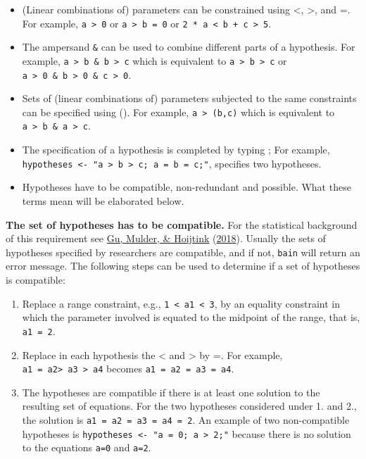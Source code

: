 \documentclass[
]{book}
\providecommand{\tightlist}{%
  \setlength{\itemsep}{0pt}\setlength{\parskip}{0pt}}
\begin{document}
\begin{itemize}
\tightlist
\item
  (Linear combinations of) parameters can be constrained using \textless, \textgreater, and
  =. For example, \texttt{a\ \textgreater{}\ 0} or
  \texttt{a\ \textgreater{}\ b\ =\ 0} or \texttt{2\ *\ a\ \textless{}\ b\ +\ c\ \textgreater{}\ 5}.
\item
  The ampersand \texttt{\&} can be used to combine different parts of a hypothesis.
  For example, \texttt{a\ \textgreater{}\ b\ \&\ b\ \textgreater{}\ c} which is equivalent to \texttt{a\ \textgreater{}\ b\ \textgreater{}\ c} or
  \texttt{a\ \textgreater{}\ 0\ \&\ b\ \textgreater{}\ 0\ \&\ c\ \textgreater{}\ 0}.
\item
  Sets of (linear combinations of) parameters subjected to the same
  constraints can be specified using (). For
  example, \texttt{a\ \textgreater{}\ (b,c)} which is equivalent to \texttt{a\ \textgreater{}\ b\ \&\ a\ \textgreater{}\ c}.
\item
  The specification of a hypothesis is completed by typing ; For example,
  \texttt{hypotheses\ \textless{}-\ "a\ \textgreater{}\ b\ \textgreater{}\ c;\ a\ =\ b\ =\ c;"}, specifies two hypotheses.
\item
  Hypotheses have to be compatible, non-redundant and possible. What
  these terms mean will be elaborated below.
\end{itemize}

\textbf{The set of hypotheses has to be compatible.} For the statistical
background of this requirement see \protect\hyperlink{ref-gu2018approximated}{Gu, Mulder, \& Hoijtink} (\protect\hyperlink{ref-gu2018approximated}{2018}). Usually the
sets of hypotheses specified by researchers are compatible, and if not,
\texttt{bain} will return an error message. The following steps can be used to
determine if a set of hypotheses is compatible:

\begin{enumerate}
\def\labelenumi{\arabic{enumi})}
\tightlist
\item
  Replace a range constraint, e.g., \texttt{1\ \textless{}\ a1\ \textless{}\ 3}, by an equality
  constraint in which the parameter involved is equated to the midpoint of the
  range, that is, \texttt{a1\ =\ 2}.
\item
  Replace in each hypothesis the \textless{} and \textgreater{} by =. For example,
  \texttt{a1\ =\ a2\textgreater{}\ a3\ \textgreater{}\ a4} becomes \texttt{a1\ =\ a2\ =\ a3\ =\ a4}.
\item
  The hypotheses are compatible if there is at least one solution to the
  resulting set of equations. For the two hypotheses considered under 1. and
  2., the solution is \texttt{a1\ =\ a2\ =\ a3\ =\ a4\ =\ 2}. An example of two non-compatible
  hypotheses is \texttt{hypotheses\ \textless{}-\ "a\ =\ 0;\ a\ \textgreater{}\ 2;"} because there is no
  solution to the equations \texttt{a=0} and \texttt{a=2}.
\end{enumerate}
\end{document}
